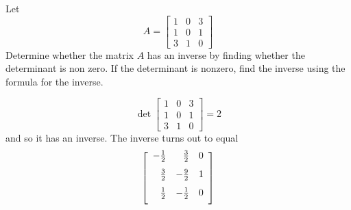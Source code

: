 \documentclass{ximera}
\begin{document}
\begin{problem}\label{prb:7.30} Let
\begin{equation*}
A =
\left[
\begin{array}{rrr}
1 & 0 & 3 \\
1 & 0 & 1 \\
3 & 1 & 0
\end{array}
\right]
\end{equation*}
Determine whether the matrix $A$ has an inverse by finding whether the
determinant is non zero. If the determinant is nonzero, find the inverse
using the formula for the inverse.
\begin{hint}
\[
\det \left[
\begin{array}{rrr}
1 & 0 & 3 \\
1 & 0 & 1 \\
3 & 1 & 0
\end{array}
\right] = 2
\]
and so it has an inverse. The inverse turns out to equal
\[
\left[
\begin{array}{rrr}
-\vspace{0.05in}\frac{1}{2} & \vspace{0.05in}\frac{3}{2} & 0 \\
\vspace{0.05in}\frac{3}{2} & -\vspace{0.05in}\frac{9}{2} & 1 \\
\vspace{0.05in}\frac{1}{2} & -\vspace{0.05in}\frac{1}{2} & 0
\end{array}
\right]
\]
\end{hint}
\end{problem}
\end{document}
